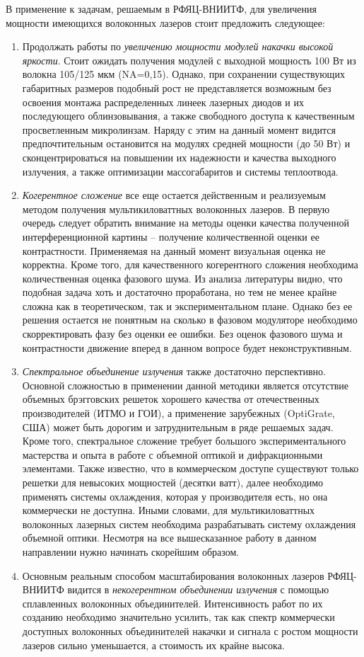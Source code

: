 В применение к задачам, решаемым в РФЯЦ-ВНИИТФ, для увеличения мощности имеющихся волоконных лазеров стоит предложить следующее:
\begin{enumerate}
\item Продолжать работы по \textit{увеличению мощности модулей накачки высокой яркости}. Стоит ожидать получения модулей с выходной мощность 100 Вт из волокна 105/125 мкм (NA=0,15). Однако, при сохранении существующих габаритных размеров подобный рост не представляется возможным без освоения монтажа распределенных линеек лазерных диодов и их последующего облинзовывания, а также свободного доступа к качественным просветленным микролинзам. Наряду с этим на данный момент видится предпочтительным остановится на модулях средней мощности (до 50 Вт) и сконцентрироваться на повышении их надежности и качества выходного излучения, а также оптимизации массогабаритов и системы теплоотвода.
\item  \textit{Когерентное сложение} все еще остается действенным и реализуемым методом получения мультикиловаттных волоконных лазеров. В первую очередь следует обратить внимание на методы оценки качества полученной интерференционной картины – получение количественной оценки ее контрастности. Применяемая на данный момент визуальная оценка не корректна. Кроме того, для качественного когерентного сложения необходима количественная оценка фазового шума. Из анализа литературы видно, что подобная задача хоть и достаточно проработана, но тем не менее крайне сложна как в теоретическом, так и экспериментальном плане. Однако без ее решения остается не понятным на сколько в фазовом модуляторе необходимо скорректировать фазу без оценки ее ошибки. Без оценок фазового шума и контрастности движение вперед в данном вопросе будет неконструктивным.
\item  \textit{Спектральное объединение излучения} также достаточно перспективно. Основной сложностью в применении данной методики является отсутствие объемных брэгговских решеток хорошего качества от отечественных производителей (ИТМО и ГОИ), а применение зарубежных (OptiGrate, США) может быть дорогим и затруднительным в ряде решаемых задач. Кроме того, спектральное сложение требует большого экспериментального мастерства и опыта в работе с объемной оптикой и дифракционными элементами. Также известно, что в коммерческом доступе существуют только решетки для невысоких мощностей (десятки ватт), далее необходимо применять системы охлаждения, которая у производителя есть, но она коммерчески не доступна. Иными словами, для мультикиловаттных волоконных лазерных систем необходима разрабатывать систему охлаждения объемной оптики. Несмотря на все вышесказанное работу в данном направлении нужно начинать скорейшим образом.
\item  Основным реальным способом масштабирования волоконных лазеров РФЯЦ-ВНИИТФ видится в \textit{некогерентном объединении излучения} с помощью сплавленных волоконных объединителей. Интенсивность работ по их созданию необходимо значительно усилить, так как спектр коммерчески доступных волоконных объединителей накачки и сигнала с ростом мощности лазеров сильно уменьшается, а стоимость их крайне высока.
\end{enumerate}

